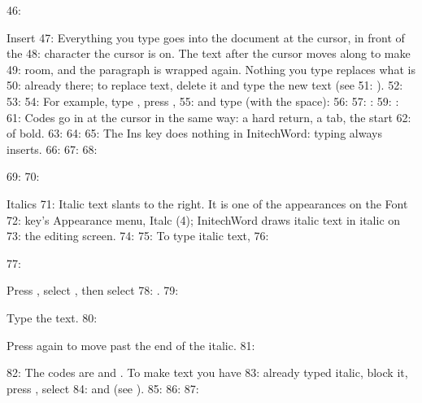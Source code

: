 46: \begin{Feature}{Insert}
47: Everything you type goes into the document at the cursor, in front of the
48: character the cursor is on.  The text after the cursor moves along to make
49: room, and the paragraph is wrapped again.  Nothing you type replaces what is
50: already there; to replace text, delete it and type the new text (see
51: ).
52: 
53: 
54: For example, type , press , 
55: and type  (with the space):
56: 
57: : 
59: : 
61: Codes go in at the cursor in the same way: a hard return, a tab, the start
62: of bold.
63: 
64: 
65: The Ins key does nothing in InitechWord: typing always inserts.
66: 
67: 
68: \end{Feature}
69: 
70: \begin{Feature}{Italics}
71: Italic text slants to the right.  It is one of the appearances on the Font
72: key's Appearance menu, Italc (4); InitechWord draws italic text in italic on
73: the editing screen.
74: 
75: To type italic text,
76: \begin{WPSteps}
77: \item Press , select , then select
78: .
79: \item Type the text.
80: \item Press  again to move past the end of the italic.
81: \end{WPSteps}
82: The codes are \Code{[ITALC]} and \Code{[italc]}.  To make text you have
83: already typed italic, block it, press , select
84:  and  (see ).
85: 
86: 
87: \end{Feature}
